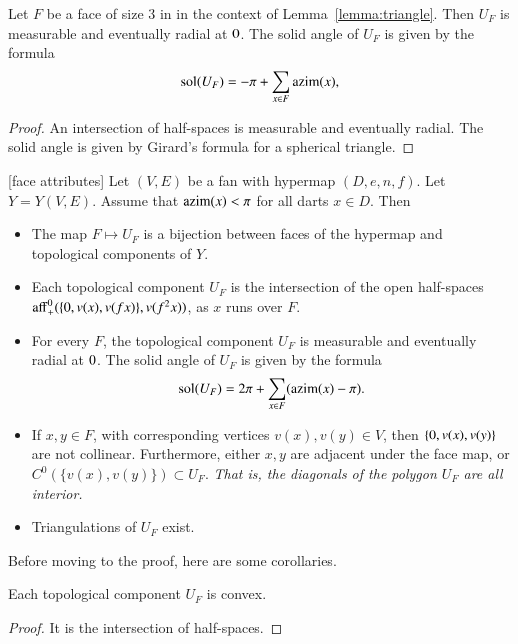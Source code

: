 \begin{corollary}\label{lemma:girard-component}
Let $F$ be a face of size $3$ in in the context of Lemma~\ref{lemma:triangle}.  Then $U_F$ is measurable and eventually radial at $0$.
The solid angle of $U_F$ is given by the formula
$$
\operatorname{sol}(U_F) = -\pi + \sum_{x\in F}{\operatorname{azim}}(x),
$$
\end{corollary}

\begin{proof} An intersection of half-spaces is measurable and
eventually radial.  The solid angle is given by Girard's formula for
a spherical triangle.
\end{proof}

\begin{lemma}[face attributes]\label{lemma:face}
Let $(V,E)$ be a fan with hypermap $(D,e,n,f)$. 
Let $Y=Y(V,E)$.
Assume that ${\operatorname{azim}}(x)<\pi$
for all darts $x\in D$.  Then
\begin{itemize}
\item The map $F\mapsto U_F$ is a bijection between faces of the hypermap
and topological components of $Y$.
\item  Each topological component $U_F$ is the intersection of the open
half-spaces ${\operatorname{aff}}_+^0(\{0,v(x),v({f x})\},v(f^2 x))$, as $x$ runs
over $F$.
\item For every $F$, the topological component $U_F$ is measurable and
eventually radial at $0$.  The solid angle of $U_F$ is given by the
formula
$$
\operatorname{sol}(U_F) = 2\pi + \sum_{x\in F}({\operatorname{azim}}(x)-\pi).
$$
\item If $x,y\in F$, with corresponding vertices $v(x),v(y)\in V$, then
$\{0,v(x),v(y)\}$ are not collinear.
Furthermore, 
either $x,y$ are adjacent under the face map, or $C^0(\{v(x),v(y)\})\subset U_F$.  {\it That is, the diagonals of the polygon $U_F$ are all interior.}
\item  Triangulations of $U_F$ exist.
\end{itemize}
\end{lemma}

Before moving to the proof, here are some corollaries.

\begin{corollary}
Each topological component $U_F$ is convex.
\end{corollary}

\begin{proof} It is the intersection of half-spaces.
\end{proof}

